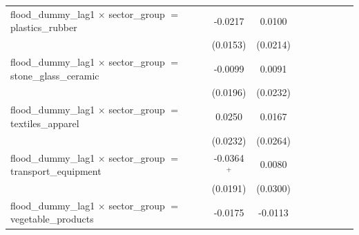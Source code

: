 \begin{tabular}{lcccccccc}
   flood\_dummy\_lag1 $\times$ sector\_group $=$ plastics\_rubber                 & -0.0217               & 0.0100                &                       &                       &                       &                       &                       &   \\   
                                                                                  & (0.0153)              & (0.0214)              &                       &                       &                       &                       &                       &   \\   
   flood\_dummy\_lag1 $\times$ sector\_group $=$ stone\_glass\_ceramic            & -0.0099               & 0.0091                &                       &                       &                       &                       &                       &   \\   
                                                                                  & (0.0196)              & (0.0232)              &                       &                       &                       &                       &                       &   \\   
   flood\_dummy\_lag1 $\times$ sector\_group $=$ textiles\_apparel                & 0.0250                & 0.0167                &                       &                       &                       &                       &                       &   \\   
                                                                                  & (0.0232)              & (0.0264)              &                       &                       &                       &                       &                       &   \\   
   flood\_dummy\_lag1 $\times$ sector\_group $=$ transport\_equipment             & -0.0364$^{+}$         & 0.0080                &                       &                       &                       &                       &                       &   \\   
                                                                                  & (0.0191)              & (0.0300)              &                       &                       &                       &                       &                       &   \\   
   flood\_dummy\_lag1 $\times$ sector\_group $=$ vegetable\_products              & -0.0175               & -0.0113               &                       &                       &                       &                       &                       &   \\   

\end{tabular}
